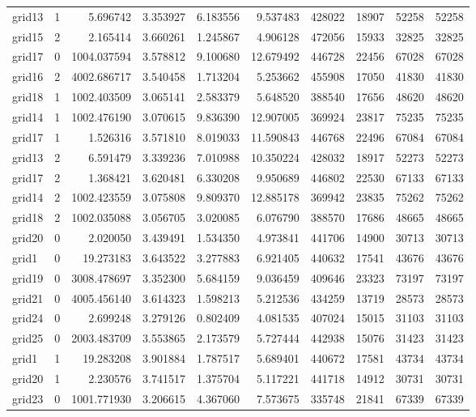\begin{longtable}{|l|r|r|r|r|r|r|r|r|r|}
grid13 & 1 & 5.696742 & 3.353927 & 6.183556 & 9.537483 & 428022 & 18907 & 52258 & 52258 \\
grid15 & 2 & 2.165414 & 3.660261 & 1.245867 & 4.906128 & 472056 & 15933 & 32825 & 32825 \\
grid17 & 0 & 1004.037594 & 3.578812 & 9.100680 & 12.679492 & 446728 & 22456 & 67028 & 67028 \\
grid16 & 2 & 4002.686717 & 3.540458 & 1.713204 & 5.253662 & 455908 & 17050 & 41830 & 41830 \\
grid18 & 1 & 1002.403509 & 3.065141 & 2.583379 & 5.648520 & 388540 & 17656 & 48620 & 48620 \\
grid14 & 1 & 1002.476190 & 3.070615 & 9.836390 & 12.907005 & 369924 & 23817 & 75235 & 75235 \\
grid17 & 1 & 1.526316 & 3.571810 & 8.019033 & 11.590843 & 446768 & 22496 & 67084 & 67084 \\
grid13 & 2 & 6.591479 & 3.339236 & 7.010988 & 10.350224 & 428032 & 18917 & 52273 & 52273 \\
grid17 & 2 & 1.368421 & 3.620481 & 6.330208 & 9.950689 & 446802 & 22530 & 67133 & 67133 \\
grid14 & 2 & 1002.423559 & 3.075808 & 9.809370 & 12.885178 & 369942 & 23835 & 75262 & 75262 \\
grid18 & 2 & 1002.035088 & 3.056705 & 3.020085 & 6.076790 & 388570 & 17686 & 48665 & 48665 \\
grid20 & 0 & 2.020050 & 3.439491 & 1.534350 & 4.973841 & 441706 & 14900 & 30713 & 30713 \\
grid1 & 0 & 19.273183 & 3.643522 & 3.277883 & 6.921405 & 440632 & 17541 & 43676 & 43676 \\
grid19 & 0 & 3008.478697 & 3.352300 & 5.684159 & 9.036459 & 409646 & 23323 & 73197 & 73197 \\
grid21 & 0 & 4005.456140 & 3.614323 & 1.598213 & 5.212536 & 434259 & 13719 & 28573 & 28573 \\
grid24 & 0 & 2.699248 & 3.279126 & 0.802409 & 4.081535 & 407024 & 15015 & 31103 & 31103 \\
grid25 & 0 & 2003.483709 & 3.553865 & 2.173579 & 5.727444 & 442938 & 15076 & 31423 & 31423 \\
grid1 & 1 & 19.283208 & 3.901884 & 1.787517 & 5.689401 & 440672 & 17581 & 43734 & 43734 \\
grid20 & 1 & 2.230576 & 3.741517 & 1.375704 & 5.117221 & 441718 & 14912 & 30731 & 30731 \\
grid23 & 0 & 1001.771930 & 3.206615 & 4.367060 & 7.573675 & 335748 & 21841 & 67339 & 67339 \\

\end{longtable}
